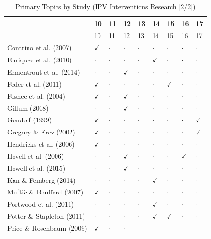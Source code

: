 \documentclass[11pt,]{tufte-book}
\begin{document}
\begin{no-prefix-table-caption}

\begin{longtable}[]{@{}lllllllll@{}}
\caption{Primary Topics by Study (IPV Interventions Research
{[}2/2{]})}\tabularnewline
\toprule
& 10 & 11 & 12 & 13 & 14 & 15 & 16 & 17\tabularnewline
\midrule
\endfirsthead
\toprule
& 10 & 11 & 12 & 13 & 14 & 15 & 16 & 17\tabularnewline
\midrule
\endhead
Contrino et al. (2007) & \(\checkmark\) & \(\cdot\) & \(\cdot\) &
\(\cdot\) & \(\cdot\) & \(\cdot\) & \(\cdot\) & \(\cdot\)\tabularnewline
Enriquez et al. (2010) & \(\cdot\) & \(\cdot\) & \(\cdot\) & \(\cdot\) &
\(\checkmark\) & \(\cdot\) & \(\cdot\) & \(\cdot\)\tabularnewline
Ermentrout et al. (2014) & \(\cdot\) & \(\cdot\) & \(\checkmark\) &
\(\cdot\) & \(\cdot\) & \(\cdot\) & \(\cdot\) & \(\cdot\)\tabularnewline
Feder et al. (2011) & \(\checkmark\) & \(\cdot\) & \(\cdot\) & \(\cdot\)
& \(\cdot\) & \(\checkmark\) & \(\cdot\) & \(\cdot\)\tabularnewline
Foshee et al. (2004) & \(\checkmark\) & \(\cdot\) & \(\checkmark\) &
\(\cdot\) & \(\cdot\) & \(\cdot\) & \(\cdot\) & \(\cdot\)\tabularnewline
Gillum (2008) & \(\cdot\) & \(\cdot\) & \(\checkmark\) & \(\cdot\) &
\(\cdot\) & \(\cdot\) & \(\cdot\) & \(\cdot\)\tabularnewline
Gondolf (1999) & \(\checkmark\) & \(\cdot\) & \(\cdot\) & \(\cdot\) &
\(\cdot\) & \(\cdot\) & \(\cdot\) & \(\checkmark\)\tabularnewline
Gregory \& Erez (2002) & \(\checkmark\) & \(\cdot\) & \(\cdot\) &
\(\cdot\) & \(\cdot\) & \(\cdot\) & \(\cdot\) &
\(\checkmark\)\tabularnewline
Hendricks et al. (2006) & \(\checkmark\) & \(\cdot\) & \(\cdot\) &
\(\cdot\) & \(\cdot\) & \(\cdot\) & \(\cdot\) & \(\cdot\)\tabularnewline
Hovell et al. (2006) & \(\cdot\) & \(\cdot\) & \(\checkmark\) &
\(\cdot\) & \(\cdot\) & \(\cdot\) & \(\checkmark\) &
\(\cdot\)\tabularnewline
Howell et al. (2015) & \(\cdot\) & \(\cdot\) & \(\checkmark\) &
\(\cdot\) & \(\cdot\) & \(\cdot\) & \(\cdot\) & \(\cdot\)\tabularnewline
Kan \& Feinberg (2014) & \(\cdot\) & \(\cdot\) & \(\cdot\) & \(\cdot\) &
\(\checkmark\) & \(\cdot\) & \(\cdot\) & \(\cdot\)\tabularnewline
Mufti\(\acute{c}\) \& Bouffard (2007) & \(\checkmark\) & \(\cdot\) &
\(\cdot\) & \(\cdot\) & \(\cdot\) & \(\cdot\) & \(\cdot\) &
\(\cdot\)\tabularnewline
Portwood et al. (2011) & \(\cdot\) & \(\cdot\) & \(\cdot\) & \(\cdot\) &
\(\checkmark\) & \(\cdot\) & \(\cdot\) & \(\cdot\)\tabularnewline
Potter \& Stapleton (2011) & \(\cdot\) & \(\cdot\) & \(\cdot\) &
\(\cdot\) & \(\checkmark\) & \(\checkmark\) & \(\cdot\) &
\(\cdot\)\tabularnewline
Price \& Rosenbaum (2009) & \(\checkmark\) & \(\cdot\) & \(\cdot\) &

\end{longtable}
\end{no-prefix-table-caption}
\end{document}

